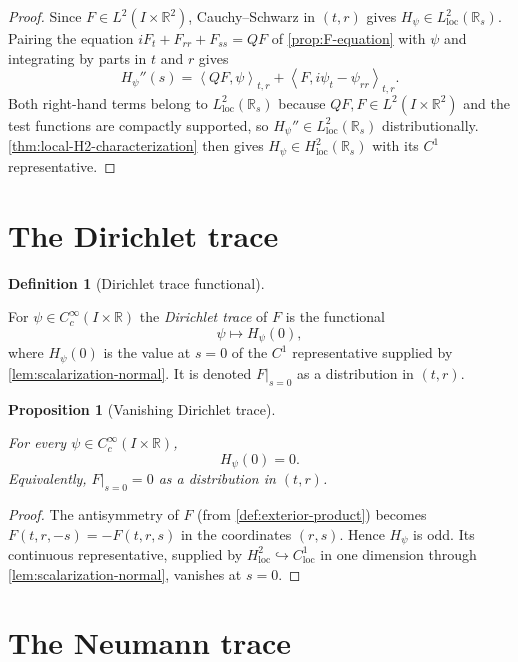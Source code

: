 \documentclass[11pt,oneside]{book}
\providecommand{\uses}[1]{}
\newtheorem{proposition}[theorem]{Proposition}
\theoremstyle{definition}
\newtheorem{definition}[theorem]{Definition}
\theoremstyle{remark}
\newcommand{\R}{\mathbb R}
\newcommand{\1}{\mathbf 1}
\newcommand{\loc}{\mathrm{loc}}
\newcommand{\pair}[2]{\left\langle #1,#2\right\rangle}
\begin{document}
\begin{proof}
\uses{prop:F-equation, thm:local-H2-characterization}
Since $F\in L^2(I\times\R^2)$, Cauchy--Schwarz in $(t,r)$ gives
$H_\psi\in L^2_{\loc}(\R_s)$. Pairing the equation $iF_t+F_{rr}+F_{ss}=QF$ of
\cref{prop:F-equation} with $\psi$ and integrating by parts in $t$ and $r$ gives
\begin{equation}
 H_\psi''(s)=\pair{QF}{\psi}_{t,r}+\pair{F}{i\psi_t-\psi_{rr}}_{t,r}.
 \label{eq:Hpsi-second}
\end{equation}
Both right-hand terms belong to $L^2_{\loc}(\R_s)$ because $QF,F\in L^2(I\times\R^2)$
and the test functions are compactly supported, so $H_\psi''\in L^2_{\loc}(\R_s)$
distributionally. \cref{thm:local-H2-characterization} then gives
$H_\psi\in H^2_{\loc}(\R_s)$ with its $C^1$ representative.
\end{proof}

\section{The Dirichlet trace}

\begin{definition}[Dirichlet trace functional]\label{def:dirichlet-trace}
\uses{lem:scalarization-normal, thm:local-H2-characterization}
For $\psi\in C_c^\infty(I\times\R)$ the \emph{Dirichlet trace} of $F$ is the
functional
\[
 \psi\longmapsto H_\psi(0),
\]
where $H_\psi(0)$ is the value at $s=0$ of the $C^1$ representative supplied by
\cref{lem:scalarization-normal}. It is denoted $F|_{s=0}$ as a distribution in
$(t,r)$.
\end{definition}

\begin{proposition}[Vanishing Dirichlet trace]\label{prop:Dirichlet-trace}
\uses{def:dirichlet-trace}
For every $\psi\in C_c^\infty(I\times\R)$,
\[
 H_\psi(0)=0.
\]
Equivalently, $F|_{s=0}=0$ as a distribution in $(t,r)$.
\end{proposition}

\begin{proof}
\uses{def:exterior-product, lem:scalarization-normal}
The antisymmetry of $F$ (from \cref{def:exterior-product}) becomes
$F(t,r,-s)=-F(t,r,s)$ in the coordinates $(r,s)$. Hence $H_\psi$ is odd. Its
continuous representative, supplied by $H^2_{\loc}\hookrightarrow C^1_{\loc}$ in
one dimension through \cref{lem:scalarization-normal}, vanishes at $s=0$.
\end{proof}

\section{The Neumann trace}
\end{document}
